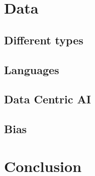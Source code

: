 \section{Data}
\subsection{Different types}
\subsection{Languages}
\subsection{Data Centric AI}
\subsection{Bias}

\section{Conclusion}